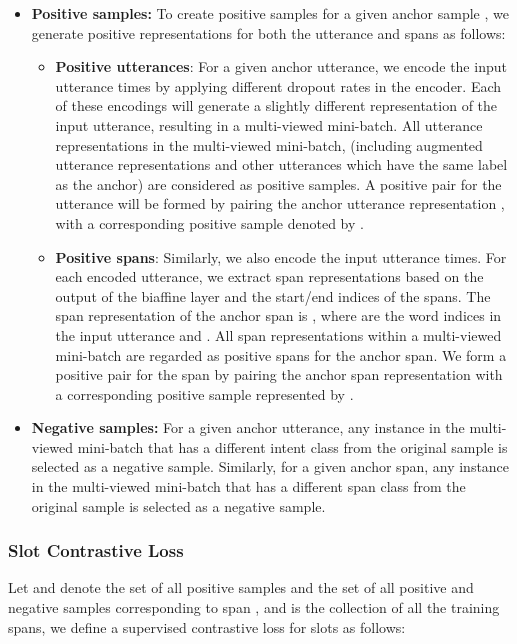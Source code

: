 \documentclass{ecai}
\begin{document}
\begin{itemize}
    \item \textbf{Positive samples:} To create positive samples for a given anchor sample , we generate positive representations for both the utterance and spans as follows:

    \begin{itemize}
        \item \textbf{Positive utterances}: For a given anchor utterance, we encode the input utterance  times by applying different dropout rates in the encoder. Each of these  encodings will generate a slightly different representation of the input utterance, resulting in a multi-viewed mini-batch. All utterance representations in the multi-viewed mini-batch, (including augmented utterance representations and other utterances which have the same label as the anchor) are considered as positive samples. A positive pair for the utterance will be formed by pairing the anchor utterance representation , with a corresponding positive sample denoted by .

        \item \textbf{Positive spans}: Similarly, we also encode the input utterance  times. For each encoded utterance, we extract span representations based on the output of the biaffine layer and the start/end indices of the spans. The span representation of the anchor span is , where  are the word indices in the input utterance and . All span representations within a multi-viewed mini-batch are regarded as positive spans for the anchor span. We form a positive pair for the span by pairing the anchor span representation  with a corresponding positive sample represented by .
        
    \end{itemize} 

    \item \textbf{Negative samples:} For a given anchor utterance, any instance in the multi-viewed mini-batch that has a different intent class from the original sample is selected as a negative sample. Similarly, for a given anchor span, any instance in the multi-viewed mini-batch that has a different span class from the original sample is selected as a negative sample.
\end{itemize}


\subsubsection{Slot Contrastive Loss}
Let  and  denote the set of all positive samples and the set of all positive and negative samples corresponding to span , and  is the collection of all the training spans, we define a supervised contrastive loss for slots as follows:
\end{document}
